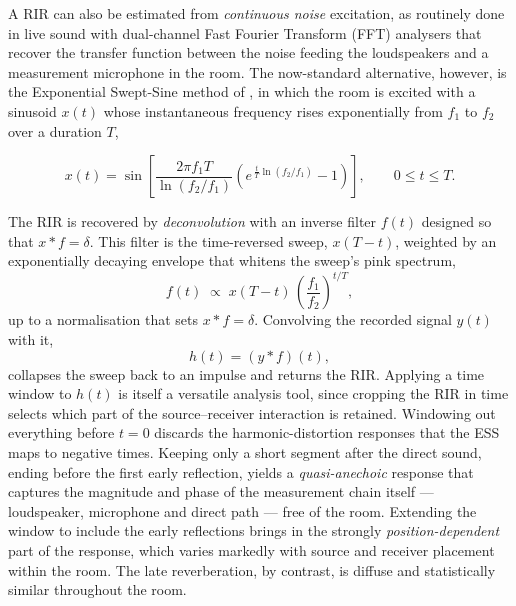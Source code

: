 A \acrshort{RIR} can also be estimated
from \emph{continuous noise} excitation, as routinely done in live sound
with dual-channel Fast Fourier Transform (FFT) analysers that recover the transfer
function between the noise feeding the loudspeakers and a measurement
microphone in the room. The now-standard alternative, however, is the
Exponential Swept-Sine method of \citet{farina2000simultaneous}, in which the room is
excited with a sinusoid $x(t)$ whose instantaneous frequency rises exponentially
from $f_1$ to $f_2$ over a duration $T$,

\begin{equation}
    x(t) = \sin\!\left[ \frac{2\pi f_1 T}{\ln(f_2/f_1)}
           \left( e^{\,\frac{t}{T}\ln(f_2/f_1)} - 1 \right) \right],
           \qquad 0 \le t \le T .
    \label{eq:ess}
\end{equation}

The \acrshort{RIR} is recovered by \emph{deconvolution} with an inverse
filter $f(t)$ designed so that $x * f = \delta$. This filter is the
time-reversed sweep, $x(T-t)$, weighted by an exponentially decaying
envelope that whitens the sweep's pink spectrum,
\begin{equation}
    f(t) \;\propto\; x(T-t)\,\left(\frac{f_1}{f_2}\right)^{\!t/T},
    \label{eq:ess_inverse}
\end{equation}
up to a normalisation that sets $x * f = \delta$. Convolving the recorded
signal $y(t)$ with it,
\begin{equation}
    h(t) = (y * f)(t),
    \label{eq:ess_deconv}
\end{equation}
collapses the sweep back to an impulse and returns the \acrshort{RIR}. Applying a time window to $h(t)$ is itself a versatile
analysis tool, since cropping the \acrshort{RIR} in time selects which part
of the source--receiver interaction is retained. Windowing out everything
before $t=0$ discards the harmonic-distortion responses that the
ESS maps to negative times. Keeping only a short
segment after the direct sound, ending before the first early reflection,
yields a \emph{quasi-anechoic} response that captures the magnitude and
phase of the measurement chain itself --- loudspeaker, microphone and
direct path --- free of the room. Extending the window to include the early
reflections brings in the strongly \emph{position-dependent} part of the
response, which varies markedly with source and receiver placement within
the room. The late reverberation, by contrast, is diffuse and statistically
similar throughout the room.


